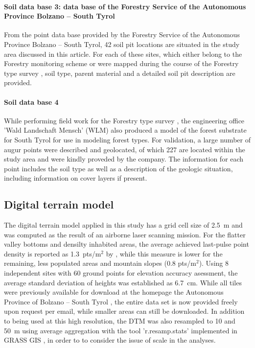 \documentclass[preprint,12pt,authoryear]{elsarticle}
\begin{document}
\paragraph{Soil data base 3: data base of the Forestry Service of the Autonomous Province Bolzano -- South Tyrol} 
From the point data base provided by the Forestry Service of the Autonomous
Province Bolzano -- South Tyrol, 42 soil pit locations  are situated in the study area discussed in this article. For each of these sites, which either belong to the Forestry monitoring scheme or were mapped during the course of the Forestry type survey \citep{APB2006}, soil type, parent material and a detailed soil pit description are provided.

\paragraph{Soil data base 4} 
While performing field work for the Forestry type survey \citep{APB2006}, the engineering office 'Wald Landschaft Mensch' (WLM) also produced a model of the forest substrate for South Tyrol for use in modeling forest types. For validation, a large number of augur points were described and geolocated, of which 227 are located within the study area and were kindly proveded by the company. The information for each point includes the soil type as well as a description of the geologic situation, including information on cover layers if present.


\subsection{Digital terrain model}
The digital terrain model applied in this study has a grid cell size of 2.5~m and was computed as the result of an airborne laser scanning mission. For the flatter valley bottoms and densilty inhabited areas, the average achieved last-pulse point density is reported as 1.3~pts/m$^2$ by \cite{Wack2005}, while this measure is lower for the remaining, less populated areas and mountain slopes (0.8 pts/m$^2$). Using 8 independent sites with 60 ground points for elevation accuracy asessment, the average standard deviation of heights was established as 6.7~cm. While all tiles were previously available for download at the homepage the Autonomous Province of Bolzano --  South Tyrol \citep{DTM}, the entire data set is now provided freely upon request per email, while smaller areas can still be downloaded. In addition to being used at this high resolution, the DTM was also resampled to 10 and 50~m using average aggregation with the tool 'r.resamp.stats' implemented in GRASS GIS \citep{GRASS}, in order to to consider the issue of scale in the analyses.
\end{document}

